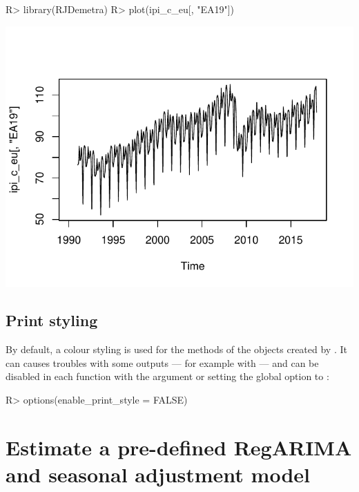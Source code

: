 \documentclass[article]{jss}
\begin{document}
\begin{CodeChunk}

\begin{CodeInput}
R> library(RJDemetra)
R> plot(ipi_c_eu[, "EA19"])
\end{CodeInput}


\begin{center}\includegraphics{img/img-basic_raw_data_plot-1} \end{center}

\end{CodeChunk}

\hypertarget{print-styling}{%
\subsection{Print styling}\label{print-styling}}

By default, a colour styling is used for the  methods of the
objects created by . It can causes troubles with some
outputs --- for example with  \citep{rmarkdown} --- and
can be disabled in each  function with the argument
 or setting the global option
 to :

\begin{CodeChunk}

\begin{CodeInput}
R> options(enable_print_style = FALSE)
\end{CodeInput}
\end{CodeChunk}

\hypertarget{pre-def-est}{%
\section{Estimate a pre-defined RegARIMA and seasonal adjustment
model}\label{pre-def-est}}
\end{document}
